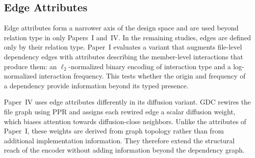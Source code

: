 \subsection{Edge Attributes}\label{sec:edge_attributes}
Edge attributes form a narrower axis of the design space and are used beyond relation type in only Papers~I and~IV. In the remaining studies, edges are defined only by their relation type. Paper~I evaluates a variant that augments file-level dependency edges with attributes describing the member-level interactions that produce them: an $\ell_2$-normalized binary encoding of interaction type and a log-normalized interaction frequency. This tests whether the origin and frequency of a dependency provide information beyond its typed presence.
 
Paper~IV uses edge attributes differently in its diffusion variant. GDC rewires the file graph using PPR and assigns each rewired edge a scalar diffusion weight, which biases attention towards diffusion-close neighbors. Unlike the attributes of Paper~I, these weights are derived from graph topology rather than from additional implementation information. They therefore extend the structural reach of the encoder without adding information beyond the dependency graph.

